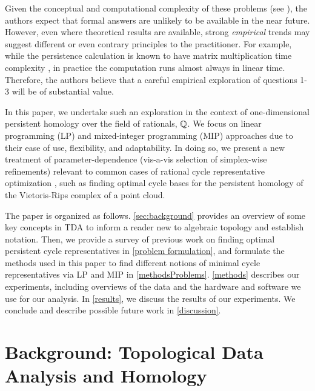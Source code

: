 Given the conceptual and computational complexity of these problems (see \cite{chenhardness}), the authors expect that formal answers are unlikely to be available in the near future. However, even where theoretical results are available, strong \emph{empirical} trends may suggest different or even contrary principles to the practitioner. For example, while the persistence calculation is known to have matrix multiplication time complexity  \cite{primoz}, in practice the computation runs almost always in linear time. Therefore, the authors believe that a careful empirical exploration of questions 1-3 will be of substantial value. 

In this paper, we undertake such an exploration in the context of one-dimensional persistent homology over the field of rationals, $\mathbb{Q}$. We focus on linear programming (LP) and mixed-integer programming (MIP) approaches due to their ease of use, flexibility, and adaptability. In doing so, we present a new treatment of parameter-dependence (vis-a-vis selection of simplex-wise refinements) relevant to common cases of rational cycle representative optimization \cite{Obayashi2018, Escolar2016}, such as finding optimal cycle bases for the persistent homology of the Vietoris-Rips complex of a point cloud. \DIFaddbegin {}\DIFaddend 

The paper is organized as follows. \se  \ref{sec:background} provides an overview of some key concepts in TDA to inform a reader new to algebraic topology and establish notation. Then, we provide a survey of previous work on finding optimal persistent cycle representatives in \se \ref{problem formulation}, and formulate the methods used in this paper to find different notions of minimal cycle representatives via LP and MIP in 
\se \ref{methodsProblems}. \se \ref{methods} describes our experiments, including overviews of the data and the hardware and software we use for our analysis. In \se \ref{results},  we discuss the results of our experiments. We conclude and describe possible future work in \se \ref{discussion}.

 \section{Background: Topological Data Analysis and \DIFdelbegin {}\DIFdelend \DIFaddbegin {}\DIFaddend Homology} 
\DIFdelbegin %
\DIFdelend \label{sec:background}


